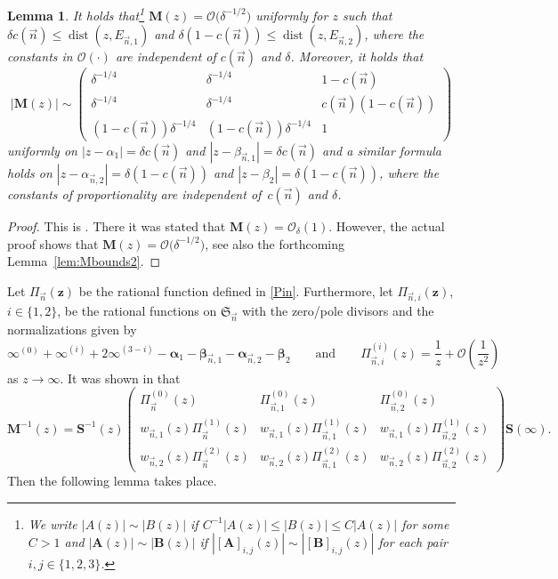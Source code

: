 \documentclass[pdftex]{sigma}
\numberwithin{equation}{section}
\newtheorem{Lemma}[Theorem]{Lemma}
\newcommand{\dist}{\operatorname{dist}}
\newcommand{\n}{{\vec n}}
\newcommand{\RS}{\boldsymbol{\mathfrak{S}}}
\newcommand{\z}	{{\boldsymbol z}}
\begin{document}
\begin{Lemma}
\label{lem:Mbounds1}
It holds that\footnote{We write $ |A(z)| \sim |B(z)| $ if $ C^{-1}|A(z)| \leq |B(z)| \leq C|A(z)| $ for some $ C>1 $ and $ |\boldsymbol A(z)| \sim |\boldsymbol B(z)| $ if $ |[\boldsymbol A]_{i,j}(z)| \sim |[\boldsymbol B]_{i,j}(z)| $ for each pair $ i,j\in\{1,2,3\} $.} $ \boldsymbol M(z) = \boldsymbol{\mathcal O}\bigl(\delta^{-1/2}\bigr) $ uniformly for $ z $ such that $ \delta c(\n) \leq \dist(z,E_{\n,1} ) $ and $ \delta(1-c(\n)) \leq \dist(z,E_{\n,2}) $, where the constants in $ \boldsymbol{\mathcal O}(\cdot) $ are independent of $ c(\n) $ and $ \delta $. Moreover, it holds that
\[
|\boldsymbol M(z)| \sim \begin{pmatrix} \delta^{-1/4} & \delta^{-1/4} & 1-c(\n) \\ \delta^{-1/4} & \delta^{-1/4} & c(\n)(1-c(\n)) \\ (1-c(\n))\delta^{-1/4} & (1-c(\n))\delta^{-1/4} & 1 \end{pmatrix}
\]
uniformly on $ |z-\alpha_1| = \delta c(\n) $ and $ |z-\beta_{\n,1}| = \delta c(\n) $ and a similar formula holds on $ |z-\alpha_{\n,2}| = \delta (1-c(\n)) $ and $ |z-\beta_2| = \delta (1-c(\n)) $, where the constants of proportionality are independent of~$ c(\n) $ and $ \delta $.
\end{Lemma}
\begin{proof}
This is \cite[Lemma~7.3]{ApDenYa21}. There it was stated that $ \boldsymbol M(z) = \boldsymbol{\mathcal O}_\delta(1) $. However, the actual proof shows that $ \boldsymbol M(z) = \boldsymbol{\mathcal O}\bigl(\delta^{-1/2}\bigr) $, see also the forthcoming Lemma~\ref{lem:Mbounds2}.
\end{proof}

Let $ \Pi_\n(\z) $ be the rational function defined in \eqref{Pin}. Furthermore, let $ \Pi_{\n,i}(\z) $, $ i\in\{1,2\} $, be the rational functions on $ \RS_\n $ with the zero/pole divisors and the normalizations given by
\begin{equation}
\label{Pini}
\infty^{(0)} + \infty^{(i)} +2 \infty^{(3-i)} - \boldsymbol\alpha_1 - \boldsymbol\beta_{\n,1} - \boldsymbol\alpha_{\n,2} - \boldsymbol\beta_2 \qquad \text{and}\qquad  \Pi_{\n,i}^{(i)}(z) = \frac1z + \mathcal O\left(\frac1{z^2}\right)
\end{equation}
as $ z\to\infty $. It was shown in \cite[equation~(7.7)]{ApDenYa21} that
\begin{equation}
\label{M-inverse}
\boldsymbol M^{-1}(z) = \boldsymbol S^{-1}(z) \begin{pmatrix} \Pi_\n^{(0)}(z) & \Pi_{\n,1}^{(0)}(z) & \Pi_{\n,2}^{(0)}(z) \\[1mm] w_{\n,1}(z)\Pi_\n^{(1)}(z) & w_{\n,1}(z)\Pi_{\n,1}^{(1)}(z) & w_{\n,1}(z)\Pi_{\n,2}^{(1)}(z) \\[1mm] w_{\n,2}(z)\Pi_\n^{(2)}(z) & w_{\n,2}(z)\Pi_{\n,1}^{(2)}(z) & w_{\n,2}(z)\Pi_{\n,2}^{(2)}(z) \end{pmatrix} \boldsymbol S(\infty).
\end{equation}
Then the following lemma takes place.
\end{document}
